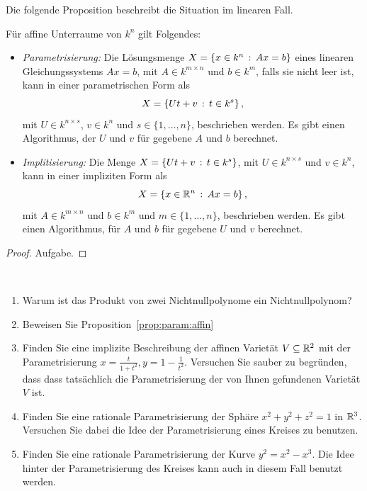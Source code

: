 \documentclass[11pt]{article}
\numberwithin{equation}{section}
\begin{document}
Die folgende Proposition beschreibt die Situation im linearen Fall. 

\begin{proposition}
	\label{prop:param:affin} 
	Für affine Unterraume von $k^n$ gilt Folgendes: 
\begin{itemize}
	\item[] \emph{Parametrisierung:} Die Lösungsmenge $X=\left\{ x \in k^n \,:\, A x =b \right\}$ eines linearen Gleichungssystems $A x =b$, mit $A \in k^{m \times n}$ und $b \in k^m$, falls sie nicht leer ist, kann in einer parametrischen Form als 
	\[ 
		X=\left\{ U t + v \,:\, t \in k^s \right\},
	\]
	mit $U \in k^{n \times s}$,  $v \in k^n$ und $s \in \{1,\ldots,n\}$, beschrieben werden. Es gibt einen Algorithmus, der $U$ und $v$ für gegebene $A$ und $b$ berechnet. 
	\item[] \emph{Implitisierung:} Die Menge $X=\left\{  U t + v \,:\, t \in k^s \right\}$, mit $ U \in k^{n \times s}$ und $v \in k^n$, kann in einer impliziten Form als  
	\[ 
		X=\left\{ x \in \mathbb{R}^n \,:\, A x = b \right\},
	\] mit $A \in k^{m \times n}$ und $b \in k^m$ und $m \in \{1,\ldots,n\}$,  beschrieben werden. Es gibt einen Algorithmus, für $A$ und $b$ für gegebene $U$ und $v$ berechnet. 
\end{itemize} 	
\end{proposition} 
\begin{proof}
	Aufgabe.  
\end{proof} 


\begin{aufgaben} {\ }
	\begin{enumerate} 
		\item Warum ist das Produkt von zwei Nichtnullpolynome ein Nichtnullpolynom? 
		\item Beweisen Sie Proposition~\ref{prop:param:affin}
		\item Finden Sie eine implizite Beschreibung der affinen Varietät  $V \subseteq \mathbb{R}^2$ mit der Parametrisierung $x = \frac{t}{1+t^2}, y = 1- \frac{1}{t^2}$. Versuchen Sie sauber zu begründen, dass  dass tatsächlich die Parametrisierung der von Ihnen gefundenen Varietät $V$ ist. 
		\item Finden Sie eine rationale Parametrisierung der Sphäre $x^2 + y^2 + z^2 =1$ in $\mathbb{R}^3$. Versuchen Sie dabei die Idee der Parametrisierung eines Kreises zu benutzen. 
		\item Finden Sie eine rationale Parametrisierung der Kurve $y^2 = x^2 - x^3$. Die Idee hinter der Parametrisierung des Kreises kann auch in diesem Fall benutzt werden. 
	\end{enumerate} 
\end{aufgaben} 
\end{document}
